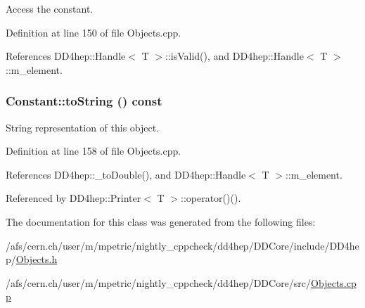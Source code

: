 Access the constant. 

Definition at line 150 of file Objects.cpp.

References DD4hep::Handle$<$ T $>$::isValid(), and DD4hep::Handle$<$ T $>$::m\_\-element.\hypertarget{class_d_d4hep_1_1_geometry_1_1_constant_a58617a2828ac516c922cc860c8f87de1}{
\subsubsection[{toString}]{ Constant::toString () const}}
\label{class_d_d4hep_1_1_geometry_1_1_constant_a58617a2828ac516c922cc860c8f87de1}


String representation of this object. 

Definition at line 158 of file Objects.cpp.

References DD4hep::\_\-toDouble(), and DD4hep::Handle$<$ T $>$::m\_\-element.

Referenced by DD4hep::Printer$<$ T $>$::operator()().

The documentation for this class was generated from the following files:\begin{DoxyCompactItemize}
\item 
/afs/cern.ch/user/m/mpetric/nightly\_\-cppcheck/dd4hep/DDCore/include/DD4hep/\hyperlink{_objects_8h}{Objects.h}\item 
/afs/cern.ch/user/m/mpetric/nightly\_\-cppcheck/dd4hep/DDCore/src/\hyperlink{_objects_8cpp}{Objects.cpp}\end{DoxyCompactItemize}
